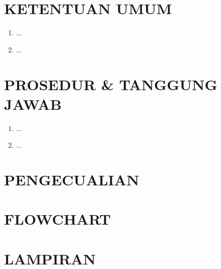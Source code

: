 \documentclass[12pt]{sop}
\begin{document}
    \section{KETENTUAN UMUM}
    \begin{enumerate}
        \item ...
        \item ...
    \end{enumerate}

    \section{PROSEDUR \& TANGGUNG JAWAB}
    \begin{enumerate}
        \item ...
        \item ...
    \end{enumerate}

    \section{PENGECUALIAN}
    \section{FLOWCHART}
    \section{LAMPIRAN}
\end{document}
